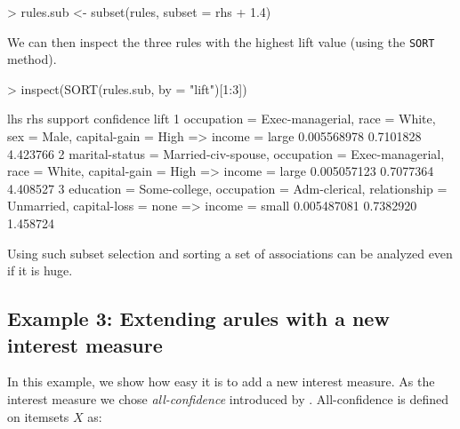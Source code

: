 \documentclass[10pt,a4paper]{article}
\newcommand{\code}[1]{\texttt{#1}}
\begin{document}
\begin{Schunk}
\begin{Sinput}
> rules.sub <- subset(rules, subset = rhs %
+     1.4)
\end{Sinput}
\end{Schunk}

We can then inspect the three rules with the highest lift value (using the
\code{SORT} method).

{\samepage\small
\begin{Schunk}
\begin{Sinput}
> inspect(SORT(rules.sub, by = "lift")[1:3])
\end{Sinput}
\begin{Soutput}
  lhs                                      rhs                  support confidence     lift
1 {occupation = Exec-managerial,                                                           
    race = White,                                                                          
    sex = Male,                                                                            
    capital-gain = High}                => {income = large} 0.005568978  0.7101828 4.423766
2 {marital-status = Married-civ-spouse,                                                    
    occupation = Exec-managerial,                                                          
    race = White,                                                                          
    capital-gain = High}                => {income = large} 0.005057123  0.7077364 4.408527
3 {education = Some-college,                                                               
    occupation = Adm-clerical,                                                             
    relationship = Unmarried,                                                              
    capital-loss = none}                => {income = small} 0.005487081  0.7382920 1.458724
\end{Soutput}
\end{Schunk}
}

Using such subset selection and sorting a set of associations can be
analyzed even if it is huge.

\subsection{Example 3: Extending arules with a new interest measure\label{sec:example-allconf}}

In this example, we show how easy it is to add a new interest measure.
As the interest measure we chose \emph{all-confidence}
introduced by \cite{arules:Omiecinski:2003}. All-confidence is
defined on itemsets $X$ as:
\end{document}
